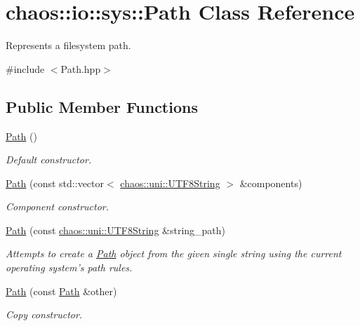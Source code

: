 \hypertarget{classchaos_1_1io_1_1sys_1_1_path}{\section{chaos\-:\-:io\-:\-:sys\-:\-:Path Class Reference}
\label{classchaos_1_1io_1_1sys_1_1_path}
}


Represents a filesystem path.  




{\ttfamily \#include $<$Path.\-hpp$>$}

\subsection*{Public Member Functions}
\begin{DoxyCompactItemize}
\item 
\hyperlink{classchaos_1_1io_1_1sys_1_1_path_a4212b2acfcc365769080ea5e915568ee}{Path} ()
\begin{DoxyCompactList}\small\item\em Default constructor. \end{DoxyCompactList}\item 
\hyperlink{classchaos_1_1io_1_1sys_1_1_path_a3647583a07600e50e51d70f1dadabcf5}{Path} (const std\-::vector$<$ \hyperlink{classchaos_1_1uni_1_1_u_t_f8_string}{chaos\-::uni\-::\-U\-T\-F8\-String} $>$ \&components)
\begin{DoxyCompactList}\small\item\em Component constructor. \end{DoxyCompactList}\item 
\hyperlink{classchaos_1_1io_1_1sys_1_1_path_a1a18b44624caafeceb66edc7b99dbad6}{Path} (const \hyperlink{classchaos_1_1uni_1_1_u_t_f8_string}{chaos\-::uni\-::\-U\-T\-F8\-String} \&string\-\_\-path)
\begin{DoxyCompactList}\small\item\em Attempts to create a \hyperlink{classchaos_1_1io_1_1sys_1_1_path}{Path} object from the given single string using the current operating system's path rules. \end{DoxyCompactList}\item 
\hyperlink{classchaos_1_1io_1_1sys_1_1_path_a40b3bf651b667adbd3eeb1ee55564211}{Path} (const \hyperlink{classchaos_1_1io_1_1sys_1_1_path}{Path} \&other)
\begin{DoxyCompactList}\small\item\em Copy constructor. \end{DoxyCompactList}\item 

\end{DoxyCompactItemize}
